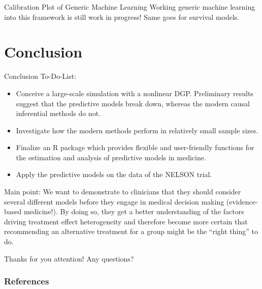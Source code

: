 \documentclass[11pt]{beamer}
\begin{document}
\begin{frame}{Calibration Plot of Generic Machine Learning}
Working generic machine learning \citep{chernozhukov2018generic} into this framework is still work in progress! Same goes for survival models.
\end{frame}

\section{Conclusion}

\begin{frame}{Conclusion}
To-Do-List:
\begin{itemize}
	\item Conceive a large-scale simulation with a nonlinear DGP. Preliminary results suggest that the predictive models break down, whereas the modern causal inferential methods do not.
	\item Investigate how the modern methods perform in relatively small sample sizes.
	\item Finalize an \textsf{R} package which provides flexible and user-friendly functions for the estimation and analysis of predictive models in medicine.
	\item Apply the predictive models on the data of the NELSON trial.
\end{itemize}
\alert{Main point}: We want to demonstrate to clinicians that they should consider several different models before they engage in medical decision making (evidence-based medicine!). By doing so, they get a better understanding of the factors driving treatment effect heterogeneity and therefore become more certain that recommending an alternative treatment for a group might be the ``right thing'' to do.
\end{frame}


\begin{frame}
\centering \Huge{Thanks for you attention! Any questions?}
\end{frame}







\begin{frame}[t,allowframebreaks]
\frametitle{References}

\end{frame}

\end{document}
